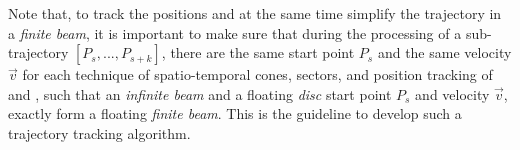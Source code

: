 %


Note that, to track the positions and at the same time simplify the trajectory in a \emph{finite beam}, it is important to make sure that during the processing of a sub-trajectory $[P_s,...,P_{s+k}]$, there are the same start point $P_s$ and the same velocity $\vec{v}$ for each technique of spatio-temporal cones, sectors, and position tracking of \ped and \sed, such that an \emph{infinite beam} and a floating \emph{disc} \wrt start point $P_s$ and velocity $\vec{v}$, exactly form a floating \emph{finite beam}. This is the guideline to develop such a trajectory tracking algorithm. 



